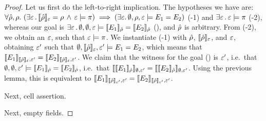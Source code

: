 \begin{proof}
Let us first do the left-to-right implication. The hypotheses we have are:
$\forall \hat\rho, \rho. \ (\exists \varepsilon \, . \, \llbracket \hat\rho \rrbracket_{\varepsilon} = \rho \, \wedge \,  \varepsilon \models \pi) \implies
(\exists \varepsilon. \, \emptyset, \rho, \varepsilon \models E_1 = E_2 )$ (\hyp{1}) and 
$\exists \varepsilon \, . \, \varepsilon \models \pi$ (\hyp{2}), whereas our goal is 
$\exists \varepsilon \, . \,  \emptyset, \emptyset, \varepsilon \models \llbracket E_1 \rrbracket_{\hat\rho} = \llbracket E_2 \rrbracket_{\hat\rho}$ (), and $\hat\rho$ is arbitrary.
From (\hyp{2}), we obtain an $\varepsilon$, such that $\varepsilon \models \pi$. We instantiate (\hyp{1}) with $\hat\rho$, $\llbracket \hat\rho \rrbracket_{\varepsilon}$, and $\varepsilon$, obtaining $\varepsilon'$ such that
$\emptyset, \llbracket \hat\rho \rrbracket_{\varepsilon}, \varepsilon' \models E_1 = E_2$, which
means that $\llbracket E_1 \rrbracket_{\llbracket \hat\rho \rrbracket_{\varepsilon}, \varepsilon'} = \llbracket E_2 \rrbracket_{\llbracket \hat\rho \rrbracket_{\varepsilon}, \varepsilon'}$.
We claim that the witness for the goal () is $\varepsilon'$, i.e.~that $\emptyset, \emptyset, \varepsilon' \models \llbracket E_1 \rrbracket_{\hat\rho} = \llbracket E_2 \rrbracket_{\hat\rho}$, i.e.~that
$\llbracket \llbracket E_1 \rrbracket_{\hat\rho} \rrbracket_{\emptyset, \varepsilon'} = \llbracket \llbracket E_2 \rrbracket_{\hat\rho} \rrbracket_{\emptyset, \varepsilon'}$. Using the previous lemma, this is equivalent to
$\llbracket E_1 \rrbracket_{\llbracket \hat\rho \rrbracket_{\varepsilon'}, \varepsilon'} = \llbracket E_2 \rrbracket_{\llbracket \hat\rho \rrbracket_{\varepsilon'}, \varepsilon'}$.


Next, cell assertion.

Next, empty fields.
\end{proof}


